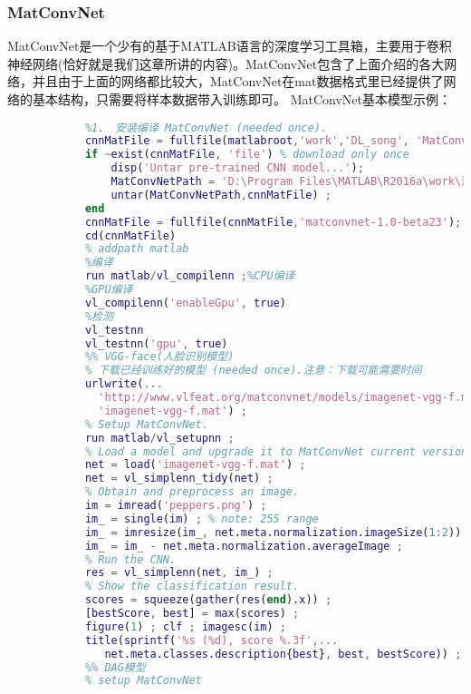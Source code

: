         \subsubsection{MatConvNet}
            \par
            MatConvNet是一个少有的基于MATLAB语言的深度学习工具箱，主要用于卷积神经网络(恰好就是我们这章所讲的内容)。MatConvNet包含了上面介绍的各大网络，并且由于上面的网络都比较大，MatConvNet在mat数据格式里已经提供了网络的基本结构，只需要将样本数据带入训练即可。
            MatConvNet基本模型示例：
            \begin{lstlisting}[language = Matlab]
            %% MatConvNet
            %1、 安装编译 MatConvNet (needed once).
            cnnMatFile = fullfile(matlabroot,'work','DL_song', 'MatConvNet');
            if ~exist(cnnMatFile, 'file') % download only once
                disp('Untar pre-trained CNN model...');
                MatConvNetPath = 'D:\Program Files\MATLAB\R2016a\work\深度学习\深度学习工具箱/matconvnet-1.0-beta23.tar.gz';
                untar(MatConvNetPath,cnnMatFile) ;
            end
            cnnMatFile = fullfile(cnnMatFile,'matconvnet-1.0-beta23');
            cd(cnnMatFile)
            % addpath matlab
            %编译
            run matlab/vl_compilenn ;%CPU编译
            %GPU编译
            vl_compilenn('enableGpu', true)
            %检测
            vl_testnn
            vl_testnn('gpu', true)
            %% VGG-face(人脸识别模型)
            % 下载已经训练好的模型 (needed once).注意：下载可能需要时间
            urlwrite(...
              'http://www.vlfeat.org/matconvnet/models/imagenet-vgg-f.mat', ...
              'imagenet-vgg-f.mat') ;
            % Setup MatConvNet.
            run matlab/vl_setupnn ;
            % Load a model and upgrade it to MatConvNet current version.
            net = load('imagenet-vgg-f.mat') ;
            net = vl_simplenn_tidy(net) ;
            % Obtain and preprocess an image.
            im = imread('peppers.png') ;
            im_ = single(im) ; % note: 255 range
            im_ = imresize(im_, net.meta.normalization.imageSize(1:2)) ;
            im_ = im_ - net.meta.normalization.averageImage ;
            % Run the CNN.
            res = vl_simplenn(net, im_) ;
            % Show the classification result.
            scores = squeeze(gather(res(end).x)) ;
            [bestScore, best] = max(scores) ;
            figure(1) ; clf ; imagesc(im) ;
            title(sprintf('%s (%d), score %.3f',...
               net.meta.classes.description{best}, best, bestScore)) ;
            %% DAG模型
            % setup MatConvNet

\end{lstlisting}
